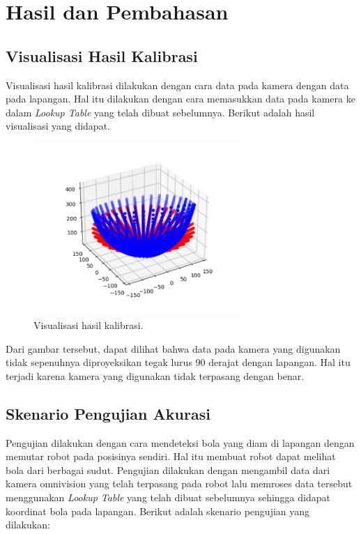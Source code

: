 \section{Hasil dan Pembahasan}
\label{sec:hasildanpembahasan}

\subsection{Visualisasi Hasil Kalibrasi}
\label{sec:visualisasihasil} 

Visualisasi hasil kalibrasi dilakukan dengan cara data pada kamera dengan data pada lapangan. Hal itu dilakukan dengan cara memasukkan data pada kamera ke dalam \emph{Lookup Table} yang telah dibuat sebelumnya. Berikut adalah hasil visualisasi yang didapat. 

\begin{figure}[ht]
  \centering
  \includegraphics[width=8cm]{gambar/visual1.png}
  \caption{Visualisasi hasil kalibrasi.}
  \label{fig:hasilkalibrasi}
\end{figure}

Dari gambar tersebut, dapat dilihat bahwa data pada kamera yang digunakan tidak sepenuhnya diproyeksikan tegak lurus 90 derajat dengan lapangan. Hal itu terjadi karena kamera yang digunakan tidak terpasang dengan benar. 

\subsection{Skenario Pengujian Akurasi}
\label{sec:skenariopengujian}

Pengujian dilakukan dengan cara mendeteksi bola yang diam di lapangan dengan memutar robot pada posisinya sendiri. Hal itu membuat robot dapat melihat bola dari berbagai sudut. Pengujian dilakukan dengan mengambil data dari kamera omnivision yang telah terpasang pada robot lalu memroses data tersebut menggunakan \emph{Lookup Table} yang telah dibuat sebelumnya sehingga didapat koordinat bola pada lapangan. Berikut adalah skenario pengujian yang dilakukan: 

